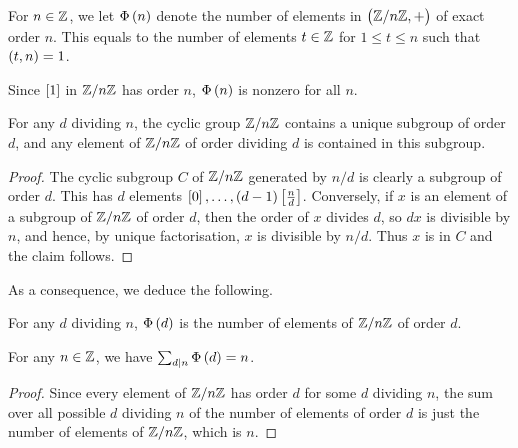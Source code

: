 \begin{definition}
For $ n \in \mathbb{Z} $, we let $ \Phi\br{n} $ denote the number of elements in $ \br{\ZZ / n\ZZ, +} $ of exact order $ n $. This equals to the number of elements $ t \in \mathbb{Z} $ for $ 1 \le t \le n $ such that $ \br{t, n} = 1 $.
\end{definition}

\begin{note*}
Since $ \sbr{1} $ in $ \mathbb{Z} / n\mathbb{Z} $ has order $ n $, $ \Phi\br{n} $ is nonzero for all $ n $.
\end{note*}

\begin{lemma}
For any $ d $ dividing $ n $, the cyclic group $ \mathbb{Z} / n\mathbb{Z} $ contains a unique subgroup of order $ d $, and any element of $ \mathbb{Z} / n\mathbb{Z} $ of order dividing $ d $ is contained in this subgroup.
\end{lemma}

\begin{proof}
The cyclic subgroup $ C $ of $ \mathbb{Z} / n\mathbb{Z} $ generated by $ n / d $ is clearly a subgroup of order $ d $. This has $ d $ elements $ \sbr{0}, \dots, \br{d - 1}\sbr{\tfrac{n}{d}} $. Conversely, if $ x $ is an element of a subgroup of $ \mathbb{Z} / n\mathbb{Z} $ of order $ d $, then the order of $ x $ divides $ d $, so $ dx $ is divisible by $ n $, and hence, by unique factorisation, $ x $ is divisible by $ n / d $. Thus $ x $ is in $ C $ and the claim follows.
\end{proof}

\pagebreak

As a consequence, we deduce the following.

\begin{corollary}
For any $ d $ dividing $ n $, $ \Phi\br{d} $ is the number of elements of $ \mathbb{Z} / n\mathbb{Z} $ of order $ d $.
\end{corollary}

\begin{corollary}
\label{cor:6.4.5}
For any $ n \in \mathbb{Z} $, we have $ \sum_{d \mid n} \Phi\br{d} = n $.
\end{corollary}

\begin{proof}
Since every element of $ \mathbb{Z} / n\mathbb{Z} $ has order $ d $ for some $ d $ dividing $ n $, the sum over all possible $ d $ dividing $ n $ of the number of elements of order $ d $ is just the number of elements of $ \mathbb{Z} / n\mathbb{Z} $, which is $ n $.
\end{proof}

